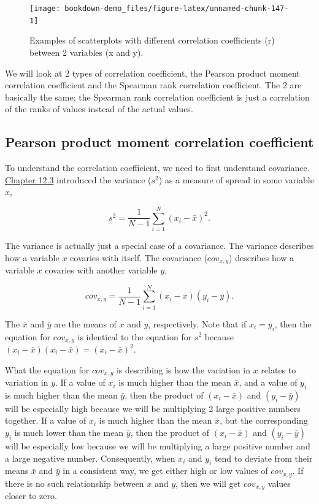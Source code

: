 \documentclass[
]{scrbook}
\begin{document}
\begin{figure}
\texttt{[image: bookdown-demo\_files/figure-latex/unnamed-chunk-147-1]} \caption{Examples of scatterplots with different correlation coefficients (r) between 2 variables (x and y).}\label{fig:unnamed-chunk-147}
\end{figure}

We will look at 2 types of correlation coefficient, the Pearson product moment correlation coefficient and the Spearman rank correlation coefficient.
The 2 are basically the same; the Spearman rank correlation coefficient is just a correlation of the ranks of values instead of the actual values.

\hypertarget{pearson-product-moment-correlation-coefficient}{%
\subsection{Pearson product moment correlation coefficient}\label{pearson-product-moment-correlation-coefficient}}

To understand the correlation coefficient, we need to first understand covariance.
\protect\hyperlink{the-variance}{Chapter 12.3} introduced the variance (\(s^{2}\)) as a measure of spread in some variable \(x\),

\[s^{2} = \frac{1}{N - 1}\sum_{i = 1}^{N}\left(x_{i} - \bar{x} \right)^{2}.\]

The variance is actually just a special case of a covariance.
The variance describes how a variable \(x\) covaries with itself.
The covariance (\(cov_{x,y}\)) describes how a variable \(x\) covaries with another variable \(y\),

\[cov_{x, y} = \frac{1}{N - 1} \sum_{i = 1}^{N}\left(x_{i} - \bar{x} \right) \left(y_{i} - \bar{y} \right).\]

The \(\bar{x}\) and \(\bar{y}\) are the means of \(x\) and \(y\), respectively.
Note that if \(x_{i} = y_{i}\), then the equation for \(cov_{x,y}\) is identical to the equation for \(s^{2}\) because \(\left(x_{i} - \bar{x} \right) \left(x_{i} - \bar{x} \right) = \left(x_{i} - \bar{x} \right)^{2}\).

What the equation for \(cov_{x,y}\) is describing is how the variation in \(x\) relates to variation in \(y\).
If a value of \(x_{i}\) is much higher than the mean \(\bar{x}\), and a value of \(y_{i}\) is much higher than the mean \(\bar{y}\), then the product of \(\left(x_{i} - \bar{x} \right)\) and \(\left(y_{i} - \bar{y} \right)\) will be especially high because we will be multiplying 2 large positive numbers together.
If a value of \(x_{i}\) is much higher than the mean \(\bar{x}\), but the corresponding \(y_{i}\) is much lower than the mean \(\bar{y}\), then the product of \(\left(x_{i} - \bar{x} \right)\) and \(\left(y_{i} - \bar{y} \right)\) will be especially low because we will be multiplying a large positive number and a large negative number.
Consequently, when \(x_{i}\) and \(y_{i}\) tend to deviate from their means \(\bar{x}\) and \(\bar{y}\) in a consistent way, we get either high or low values of \(cov_{x,y}\).
If there is no such relationship between \(x\) and \(y\), then we will get \(cov_{x,y}\) values closer to zero.
\end{document}
